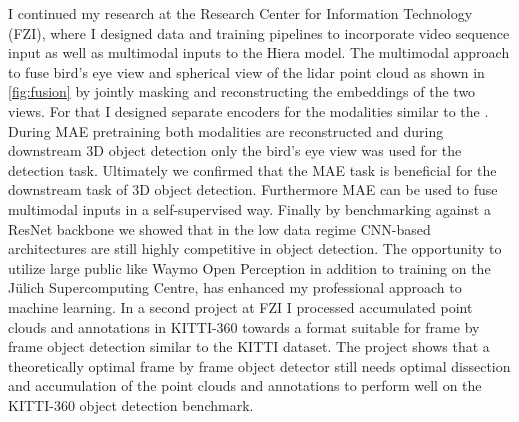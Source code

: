 I continued my research at the Research Center for Information Technology (FZI), where I designed data and training pipelines 
to incorporate video sequence input as well as multimodal inputs to the Hiera model. The multimodal approach to fuse bird's eye view and 
spherical view of the lidar point cloud as shown in \autoref{fig:fusion} by jointly masking 
and reconstructing the embeddings of the two views. For that I designed separate encoders for the modalities 
similar to the \cite{multimae}. During MAE pretraining both modalities are reconstructed and during downstream 3D object detection
only the bird's eye view was used for the detection task. Ultimately we confirmed that the MAE task is beneficial 
for the downstream task of 3D object detection. Furthermore MAE can be used to fuse multimodal inputs in a self-supervised way.
Finally by benchmarking against a ResNet backbone we showed that in the low data regime CNN-based architectures 
are still highly competitive in object detection.
The opportunity to utilize large public like Waymo Open Perception in addition 
 to training on the Jülich Supercomputing Centre, has enhanced my professional approach to machine learning. 
In a second project at FZI I processed accumulated point clouds and annotations in KITTI-360 
 towards a format suitable for frame by frame object detection similar to the KITTI dataset. The project shows
 that a theoretically optimal frame by frame object detector still needs optimal dissection and 
 accumulation of the point clouds and annotations to perform well on the KITTI-360 object detection benchmark.
 





